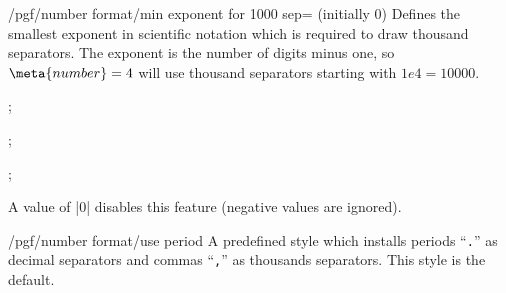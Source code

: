 \begin{key}{/pgf/number format/min exponent for 1000 sep= (initially 0)}
    Defines the smallest exponent in scientific notation which is required to
    draw thousand separators. The exponent is the number of digits minus one,
    so $\meta{number}=4$ will use thousand separators starting with $1e4 =
    10000$.
\begin{codeexample}[pre={\begin{lateximage}},post={\end{lateximage}}]
; 
\end{codeexample}

\begin{codeexample}[pre={\begin{lateximage}},post={\end{lateximage}}]
; 
\end{codeexample}
\begin{codeexample}[pre={\begin{lateximage}},post={\end{lateximage}}]
; 
\end{codeexample}
    \noindent A value of |0| disables this feature (negative values are
    ignored).
\end{key}

\begin{key}{/pgf/number format/use period}
    A predefined style which installs periods ``\texttt{.}'' as decimal
    separators and commas ``\texttt{,}'' as thousands separators. This style is
    the default.
\begin{codeexample}[pre={\begin{lateximage}},post={\end{lateximage}}]
\end{codeexample}
\begin{codeexample}[pre={\begin{lateximage}},post={\end{lateximage}}]
\end{codeexample}
\end{key}

